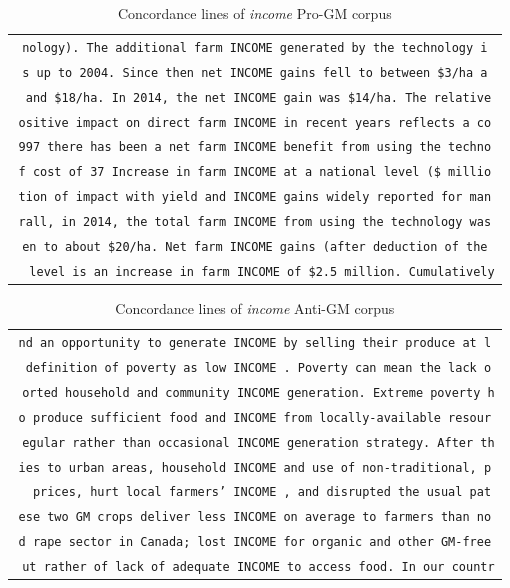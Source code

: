 \begin{table}[H]
\begin{footnotesize}
\centering
\begin{tabular}{c} 
\texttt{nology). The additional farm INCOME generated by the technology i} \\
\texttt{s up to 2004. Since then net INCOME gains fell to between \$3/ha a} \\
\texttt{ and \$18/ha. In 2014, the net INCOME gain was \$14/ha. The relative} \\
\texttt{ositive impact on direct farm INCOME in recent years reflects a co} \\
\texttt{997 there has been a net farm INCOME benefit from using the techno} \\
\texttt{f cost of 37 Increase in farm INCOME at a national level (\$ millio} \\
\texttt{tion of impact with yield and INCOME gains widely reported for man} \\
\texttt{rall, in 2014, the total farm INCOME from using the technology was} \\
\texttt{en to about \$20/ha. Net farm INCOME gains (after deduction of the} \\
\texttt{\ \ level is an increase in farm INCOME of \$2.5 million. Cumulatively}
 \end{tabular}
\caption{Concordance lines of \textit{income} Pro-GM corpus}
\label{tab:table1}
\end{footnotesize}
\end{table}

\begin{table}[H]
\begin{footnotesize}
\centering
\begin{tabular}{c} 
\texttt{nd an opportunity to generate INCOME by selling their produce at l} \\
\texttt{ definition of poverty as low INCOME . Poverty can mean the lack o} \\
\texttt{\ orted household and community INCOME generation. Extreme poverty h} \\
\texttt{o produce sufficient food and INCOME from locally-available resour} \\
\texttt{\ egular rather than occasional INCOME generation strategy. After th} \\
\texttt{ies to urban areas, household INCOME and use of non-traditional, p} \\
\texttt{\ \ prices, hurt local farmers' INCOME , and disrupted the usual pat} \\
\texttt{ese two GM crops deliver less INCOME on average to farmers than no} \\
\texttt{d rape sector in Canada; lost INCOME for organic and other GM-free} \\
\texttt{\ ut rather of lack of adequate INCOME to access food. In our countr}
 \end{tabular}
\caption{Concordance lines of \textit{income} Anti-GM corpus}
\label{tab:table1}
\end{footnotesize}
\end{table}


